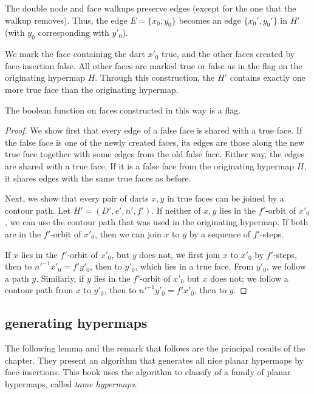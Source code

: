 The double node and face walkups preserve edges (except for
the one that the walkup removes).
Thus, the edge $E=\{x_0,y_0\}$
becomes an edge $\{x_0',y_0'\}$ in $H'$
(with $y_0$ corresponding with $y'_0$).

We mark the face containing the dart $x'_0$ true, and the other
faces created by face-insertion false.   All other faces are
marked true or false as in the flag on the originating hypermap $H$.  
Through this
construction, the $H'$ contains exactly one more true face
than the originating hypermap.

\begin{lemma}\label{lemma:flag} 
The boolean function on faces constructed in this way is a
flag.
\end{lemma}

\begin{proof}  We show first that every edge of a false face is shared
with a true face.  If the false face is one of the newly created
faces, its edges are those along the new true face together
with some edges from the old false
face. Either way, the edges are shared with a true face.   If it is a
false face from the originating hypermap $H$, 
it shares edges with the
same true faces as before.

Next, we show that every pair of darts $x,y$ in true faces can be
joined by a contour path.  Let $H'=(D',e',n',f')$.  
If neither of $x,y$ lies in the
$f'$-orbit of $x'_0$, we can use the contour path that was used in the
originating hypermap.  If both are in the $f'$-orbit of $x'_0$, then
we can join $x$ to $y$ by a sequence of $f'$-steps.

If $x$ lies in the $f'$-orbit of $x'_0$, but $y$ does not, 
we first join $x$
to $x'_0$ by $f'$-steps, then to $n'^{-1} x'_0= f' y'_0$, then to $y'_0$,
which lies in a true face.
From $y'_0$, we follow a path $y$.
Similarly, if $y$ lies in the $f'$-orbit of $x'_0$ but $x$ does not; 
we follow a contour path from $x$ to $y'_0$, then to $n'^{-1} y'_0 = f'
x'_0$, then to $y$.
\end{proof}

\subsection{generating hypermaps}

The following lemma
and the remark that follows are the principal results of the
chapter.  They present an algorithm that 
generates all nice planar hypermaps by face-insertions.
This book uses the algorithm to classify of a family of
planar hypermaps, called {\it tame hypermaps}.

